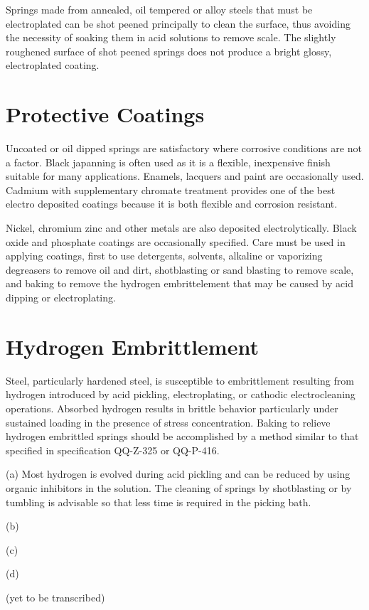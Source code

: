 \documentclass[10pt]{article}
\begin{document}
Springs made from annealed, oil tempered or alloy steels that must be electroplated can be shot peened principally to clean the surface, thus avoiding the necessity of soaking them in acid solutions to remove scale.
The slightly roughened surface of shot peened springs does not produce a bright glossy, electroplated coating.

\section{Protective Coatings} %
Uncoated or oil dipped springs are satisfactory where corrosive conditions are not a factor.
Black japanning is often used as it is a flexible, inexpensive finish suitable for many applications.
Enamels, lacquers and paint are occasionally used. 
Cadmium with supplementary chromate treatment provides one of the best electro deposited coatings because it is both flexible and corrosion resistant.

Nickel, chromium zinc and other metals are also deposited electrolytically.
Black oxide and phosphate coatings are occasionally specified.
Care must be used in applying coatings, first to use detergents, solvents, alkaline or vaporizing degreasers to remove oil and dirt, shotblasting or sand blasting to remove scale, and baking to remove the hydrogen embrittelement that may be caused by acid dipping or electroplating.

\section{Hydrogen Embrittlement} %
Steel, particularly hardened steel, is susceptible to embrittlement resulting from hydrogen introduced by acid pickling, electroplating, or cathodic electrocleaning operations.
Absorbed hydrogen results in brittle behavior particularly under sustained loading in the presence of stress concentration.
Baking to relieve hydrogen embrittled springs should be accomplished by a method similar to that specified in specification QQ-Z-325 or QQ-P-416.

(a) Most hydrogen is evolved during acid pickling and can be reduced by using organic inhibitors in the solution.
The cleaning of springs by shotblasting or by tumbling is advisable so that less time is required in the picking bath.

(b)

(c)

(d)

(yet to be transcribed)
\end{document}
